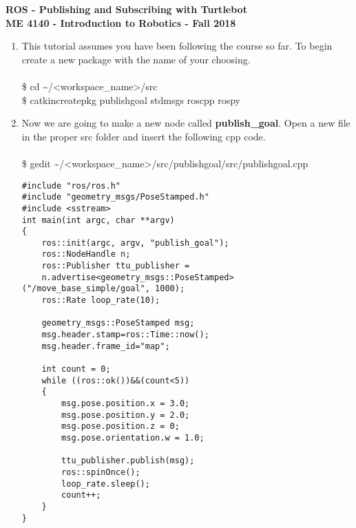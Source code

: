 \documentclass[12pt]{article}
\newcommand{\R}{\color{red}}
\newcommand{\K}{\color{black}}
\newcommand{\wspname}{\R<workspace\_name>\K}
\newcommand{\home}{\textasciitilde/}
\begin{document}
\thispagestyle{plain}

\begin{center}
   {\bf \Large ROS - Publishing and Subscribing with Turtlebot }\vspace{2mm} \\
   {\bf \large ME 4140 - Introduction to Robotics - Fall 2018} \\
\end{center}


\begin{enumerate}
    
    \item This tutorial assumes you have been following the course so far. To begin create a new package with the name of your choosing.\\\\
        {\selectfont  \hspace{5mm} \$ cd \home\wspname/src }\\
        {\selectfont  \hspace{5mm} \$ catkin\textunderscore create\textunderscore pkg publish\textunderscore goal std\textunderscore msgs roscpp rospy}
    

    \item Now we are going to make a new node called {\bf publish\_goal}. Open a new file in the proper src folder and insert the following cpp code.\\ \\
{\selectfont  \hspace{5mm} \$ gedit \home\wspname/src/publish\textunderscore goal/src/publish\textunderscore goal.cpp  }
    
        \begin{lstlisting}
#include "ros/ros.h"
#include "geometry_msgs/PoseStamped.h"
#include <sstream>
int main(int argc, char **argv)
{
    ros::init(argc, argv, "publish_goal");
    ros::NodeHandle n;
    ros::Publisher ttu_publisher =
    n.advertise<geometry_msgs::PoseStamped>("/move_base_simple/goal", 1000);
    ros::Rate loop_rate(10);

    geometry_msgs::PoseStamped msg;
    msg.header.stamp=ros::Time::now();
    msg.header.frame_id="map";

    int count = 0;
    while ((ros::ok())&&(count<5))  
    {               
        msg.pose.position.x = 3.0;
        msg.pose.position.y = 2.0;
        msg.pose.position.z = 0;
        msg.pose.orientation.w = 1.0;

        ttu_publisher.publish(msg);
        ros::spinOnce();
        loop_rate.sleep();
        count++;
    }
}
\end{lstlisting}
    

\end{enumerate}
\end{document}
